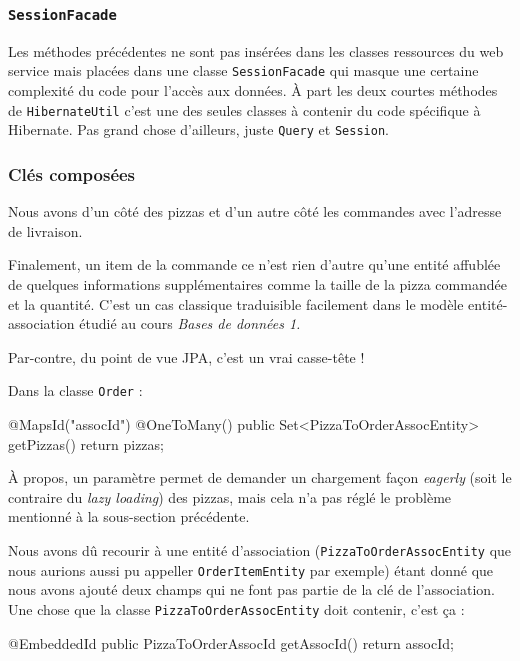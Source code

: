 \cprotect\subsubsection{\verb|SessionFacade|}

Les méthodes précédentes ne sont pas insérées dans les classes ressources du web service mais placées
dans une classe \verb|SessionFacade| qui masque une certaine complexité du code pour l'accès aux données.
À part les deux courtes méthodes de \verb|HibernateUtil| c'est une des seules classes à contenir du code
spécifique à Hibernate. Pas grand chose d'ailleurs, juste \verb|Query| et \verb|Session|.

\subsubsection{Clés composées}

Nous avons d'un côté des pizzas et d'un autre côté les commandes avec l'adresse de livraison.

Finalement, un item de la commande ce n'est rien d'autre qu'une entité affublée de quelques informations supplémentaires
comme la taille de la pizza commandée et la quantité. C'est un cas classique traduisible facilement dans le modèle 
entité-association étudié au cours \emph{Bases de données 1.}

Par-contre, du point de vue JPA, c'est un vrai casse-tête !

Dans la classe \verb|Order| :

\begin{javacode}
    @MapsId("assocId")
    @OneToMany()
    public Set<PizzaToOrderAssocEntity> getPizzas() {
        return pizzas;
    }
\end{javacode}

À propos, un paramètre permet de demander un chargement façon \emph{eagerly} (soit le contraire du \emph{lazy loading})
des pizzas, mais cela n'a pas réglé le problème mentionné à la sous-section précédente.

Nous avons dû recourir à une entité d'association (\verb|PizzaToOrderAssocEntity| que nous aurions aussi
pu appeller \verb|OrderItemEntity| par exemple)
étant donné que nous avons ajouté deux champs qui ne font pas partie de la clé de l'association.
Une chose que la classe \verb|PizzaToOrderAssocEntity| doit contenir, c'est ça :

\begin{javacode}
    @EmbeddedId
    public PizzaToOrderAssocId getAssocId() {
        return assocId;
    }
\end{javacode}

